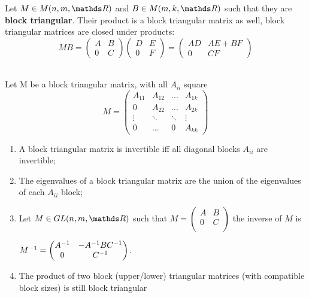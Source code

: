 \documentclass[ComputationalMathematics.tex]{subfiles}
\begin{document}
\begin{proposition}
  Let $M \in M(n, m, \R)$ and $B \in M(m, k, \R)$ such that they are \textbf{block triangular}.
  Their product is a block triangular matrix as well, block triangular matrices
are closed under products:
  $$M B 
  = \begin{pmatrix}
    A & B\\
    0 & C
  \end{pmatrix}
  \begin{pmatrix}
    D & E\\
    0 & F
  \end{pmatrix}
  = 
  \begin{pmatrix}
    AD & AE + BF\\
    0 & CF
  \end{pmatrix}$$
\end{proposition}

\begin{proposition}~\\
    Let M be a block triangular matrix, with all $A_{ii}$ square
    $$M 
      = \begin{pmatrix}
        A_{11}  & A_{12} & ... & A_{1k}\\
        0       & A_{22} & ... & A_{2k}\\
        \vdots  &\ddots & \ddots & \vdots\\
        0       & ... & 0 & A_{kk}
      \end{pmatrix}$$ 
    \begin{enumerate}
      \item A block triangular matrix is invertible iff all diagonal blocks $A_{ii}$ are invertible;
      \item The eigenvalues of a block triangular matrix are the union of the eigenvalues of each $A_{ii}$ block;
      \item Let $M \in GL(n, m, \R)$ such that $M= 
        \begin{pmatrix}
          A & B\\
          0 & C\\
        \end{pmatrix}$ 
       the inverse of $M$ is 
        
        ${M}^{-1} = 
        \begin{pmatrix}
          {A}^{-1} & -{A}^{-1}B{C}^{-1}\\
          0 & {C}^{-1}
        \end{pmatrix}$.
      \item The product of two block (upper/lower) triangular matrices
(with compatible block sizes) is still block triangular
    \end{enumerate}
  \end{proposition}
\end{document}
